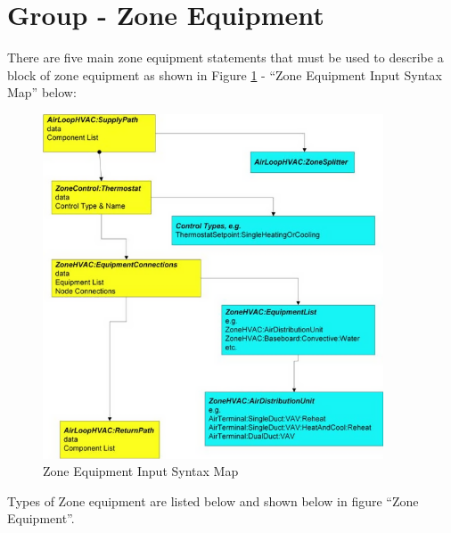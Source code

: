 \section{Group - Zone Equipment}\label{group---zone-equipment}

There are five main zone equipment statements that must be used to describe a block of zone equipment as shown in Figure \ref{fig:zone-equipment-syntax-map} - ``Zone Equipment Input Syntax Map'' below:

\begin{figure}[hbtp]
\centering
\includegraphics[width=0.9\textwidth, height=0.9\textheight, keepaspectratio=true]{media/image261.png}
\caption{Zone Equipment Input Syntax Map \protect \label{fig:zone-equipment-syntax-map}}
\end{figure}

Types of Zone equipment are listed below and shown below in figure ``Zone Equipment''.


